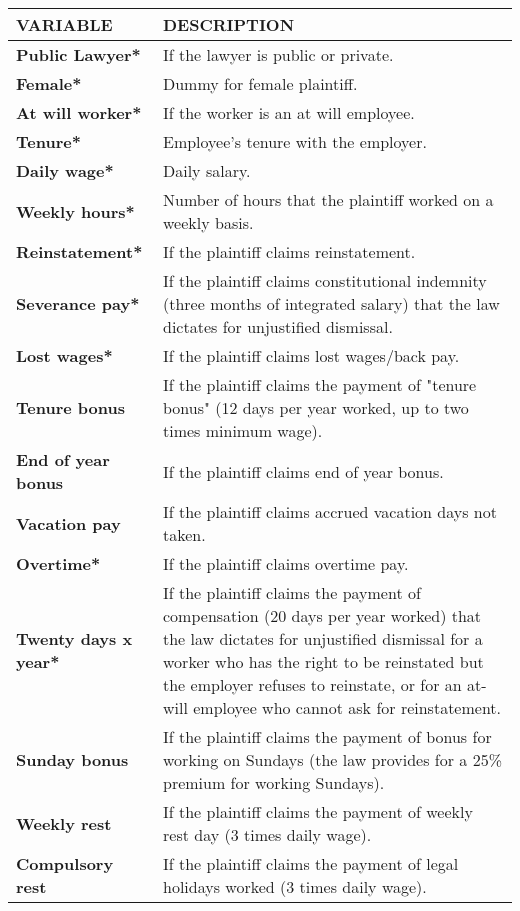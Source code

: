\begin{tabular}{p{2cm}p{12cm}}
\toprule
\multicolumn{1}{l}{\textbf{VARIABLE}} & \multicolumn{1}{l}{\textbf{DESCRIPTION}} \\
\midrule
\midrule
\textbf{Public Lawyer*} & If the lawyer is public or private. \\
\textbf{Female*} & Dummy for female plaintiff. \\
\textbf{At will worker*} & If the worker is an at will employee. \\
\textbf{Tenure*} & Employee's tenure with the employer. \\
\textbf{Daily wage*} & Daily salary. \\
\textbf{Weekly hours*} & Number of hours that the plaintiff worked on a weekly basis. \\
\textbf{Reinstatement*} & If the plaintiff claims reinstatement. \\
\textbf{Severance pay*} & If the plaintiff claims constitutional indemnity (three months of integrated salary) that the law dictates for unjustified dismissal. \\
\textbf{Lost wages*} & If the plaintiff claims lost wages/back pay. \\
\textbf{Tenure bonus} & If the plaintiff claims the payment of "tenure bonus" (12 days per year worked, up to two times minimum wage). \\
\textbf{End of year bonus} & If the plaintiff claims end of year bonus. \\
\textbf{Vacation pay} & If the plaintiff claims accrued vacation days not taken. \\
\textbf{Overtime*} & If the plaintiff claims overtime pay. \\
\textbf{Twenty days x year*} & If the plaintiff claims the payment of compensation (20 days per year worked) that the law dictates for unjustified dismissal for a worker who has the right to be reinstated but the employer refuses to reinstate, or for an at-will employee who cannot ask for reinstatement. \\
\textbf{Sunday bonus} & If the plaintiff claims the payment of bonus for working on Sundays (the law provides for a 25\% premium for working Sundays). \\
\textbf{Weekly rest} & If the plaintiff claims the payment of weekly rest day (3 times daily wage). \\
\textbf{Compulsory rest} & If the plaintiff claims the payment of legal holidays worked (3 times daily wage). \\

\end{tabular}
